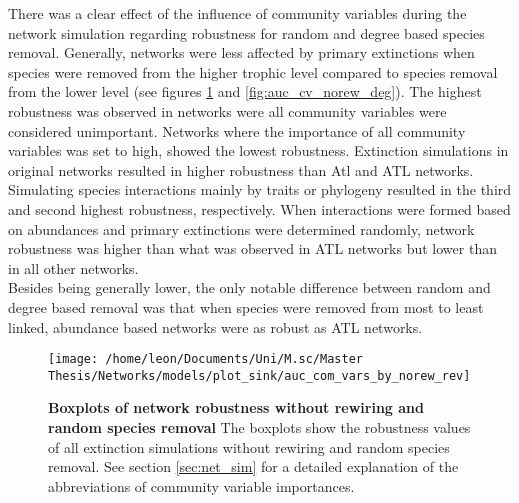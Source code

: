 \documentclass[12pt,a4paper]{article}
\begin{document}
There was a clear effect of the influence of community variables during the network simulation regarding robustness for random and degree based species removal. Generally, networks were less affected by primary extinctions when species were removed from the higher trophic level compared to species removal from the lower level (see figures \ref{fig:auc_cv_norew} and \ref{fig:auc_cv_norew_deg}). The highest robustness was observed in networks were all community variables were considered unimportant. Networks where the importance of all community variables was set to high, showed the lowest robustness. Extinction simulations in original networks resulted in higher robustness than Atl and ATL networks. Simulating species interactions mainly by traits or phylogeny resulted in the third and second highest robustness, respectively. When interactions were formed based on abundances and primary extinctions were determined randomly, network robustness was higher than what was observed in ATL networks but lower than in all other networks.\\ Besides being generally lower, the only notable difference between random and degree based removal was that when species were removed from most to least linked, abundance based networks were as robust as ATL networks. \par




\begin{figure}[H]
	 \centering
	 \texttt{[image: /home/leon/Documents/Uni/M.sc/Master Thesis/Networks/models/plot\_sink/auc\_com\_vars\_by\_norew\_rev]}
	 \captionsetup{width = \textwidth}
	 \caption[Boxplots of network robustness without rewiring and random species removal]{\textbf{Boxplots of network robustness without rewiring and random species removal} The boxplots show the robustness values of all extinction simulations without rewiring and random species removal. See section \ref{sec:net_sim} for a detailed explanation of the abbreviations of community variable importances.}
	 \label{fig:auc_cv_norew}
\end{figure}


\end{document}
